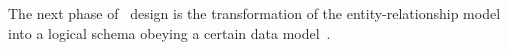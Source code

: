 %
%
The next phase of \db\ design is the transformation of the entity-relationship model into a logical schema obeying a certain data model~\cite{SS2005EIDDDFDB:SDLDUTRDM}.
%
%
\endhsection%
%
